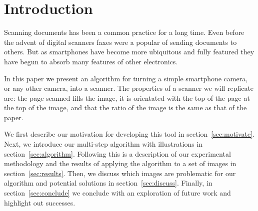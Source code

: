 \section{Introduction}
\label{sec:intro}

Scanning documents has been a common practice for a long time.
Even before the advent of digital scanners faxes were a popular of sending documents to others.
But as smartphones have become more ubiquitous and fully featured they have begun to absorb many features of other electronics.

In this paper we present an algorithm for turning a simple smartphone camera, or any other camera, into a scanner.
The properties of a scanner we will replicate are: the page scanned fills the image, it is orientated with the top of the page at the top of the image, and that the ratio of the image is the same as that of the paper.

We first describe our motivation for developing this tool in section~\ref{sec:motivate}.
Next, we introduce our multi-step algorithm with illustrations in section~\ref{sec:algorithm}.
Following this is a description of our experimental methodology and the results of applying the algorithm to a set of images in section~\ref{sec:results}.
Then, we discuss which images are problematic for our algorithm and potential solutions in section~\ref{sec:discuss}.
Finally, in section~\ref{sec:conclude} we conclude with an exploration of future work and highlight out successes.
